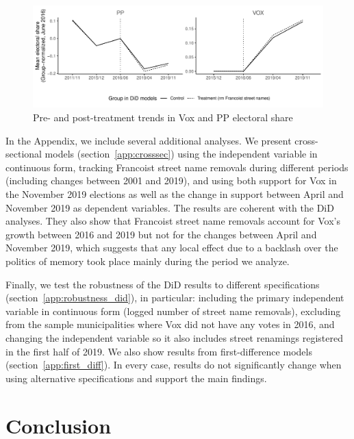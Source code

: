 \documentclass[12pt, titlepage]{article}
\begin{document}
\begin{figure}[htb!]
\centering

  \includegraphics[width = \textwidth]{img/par_trends_norm}

  \caption{Pre- and post-treatment trends in Vox and PP electoral share}\label{fig:par_trends_norm}

\end{figure}


In the Appendix, we include several additional analyses. We present cross-sectional models (section~\ref{app:crosssec}) using the independent variable in continuous form, tracking Francoist street name removals during different periods (including changes between 2001 and 2019), and using both support for Vox in the November 2019 elections as well as the change in support between April and November 2019 as dependent variables.
The results are coherent with the DiD analyses. They also show that Francoist street name removals account for Vox's growth between 2016 and 2019 but not for the changes between April and November 2019, which suggests that any local effect due to a backlash over the politics of memory took place mainly during the period we analyze.

Finally, we test the robustness of the DiD results to different specifications (section~\ref{app:robustness_did}), in particular: including the primary independent variable in continuous form (logged number of street name removals), excluding from the sample municipalities where Vox did not have any votes in 2016, and changing the independent variable so it also includes street renamings registered in the first half of 2019.
We also show results from first-difference models (section~\ref{app:first_diff}).
In every case, results do not significantly change when using alternative specifications and support the main findings.

\section*{Conclusion}
\end{document}
